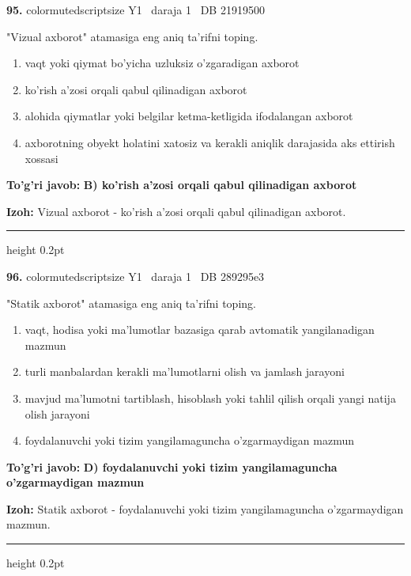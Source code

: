 \documentclass[10pt,a4paper,oneside]{article}
\begin{document}
\noindent\textbf{\color{ink}95.}  {color{muted}scriptsize Y1 \textbullet\ daraja 1 \textbullet\ DB 21919500}
\par
"Vizual axborot" atamasiga eng aniq ta'rifni toping.
\begin{enumerate}[label=\Alph*),leftmargin=9mm]
\item vaqt yoki qiymat bo'yicha uzluksiz o'zgaradigan axborot
\item ko'rish a'zosi orqali qabul qilinadigan axborot
\item alohida qiymatlar yoki belgilar ketma-ketligida ifodalangan axborot
\item axborotning obyekt holatini xatosiz va kerakli aniqlik darajasida aks ettirish xossasi
\end{enumerate}
\begin{tcolorbox}[enhanced,breakable,colback=teal!4,colframe=teal!50!black,boxrule=0.5pt,arc=1.1mm,left=3mm,right=3mm,top=1.7mm,bottom=1.7mm,before skip=2mm,after skip=2mm]
\textbf{\color{teal}To'g'ri javob:} \textbf{B) ko'rish a'zosi orqali qabul qilinadigan axborot}
\par\smallskip
\textbf{Izoh:} Vizual axborot - ko'rish a'zosi orqali qabul qilinadigan axborot.
\end{tcolorbox}
\vspace{2mm}\hrule height 0.2pt \vspace{3mm}

\noindent\textbf{\color{ink}96.}  {color{muted}scriptsize Y1 \textbullet\ daraja 1 \textbullet\ DB 289295e3}
\par
"Statik axborot" atamasiga eng aniq ta'rifni toping.
\begin{enumerate}[label=\Alph*),leftmargin=9mm]
\item vaqt, hodisa yoki ma'lumotlar bazasiga qarab avtomatik yangilanadigan mazmun
\item turli manbalardan kerakli ma'lumotlarni olish va jamlash jarayoni
\item mavjud ma'lumotni tartiblash, hisoblash yoki tahlil qilish orqali yangi natija olish jarayoni
\item foydalanuvchi yoki tizim yangilamaguncha o'zgarmaydigan mazmun
\end{enumerate}
\begin{tcolorbox}[enhanced,breakable,colback=teal!4,colframe=teal!50!black,boxrule=0.5pt,arc=1.1mm,left=3mm,right=3mm,top=1.7mm,bottom=1.7mm,before skip=2mm,after skip=2mm]
\textbf{\color{teal}To'g'ri javob:} \textbf{D) foydalanuvchi yoki tizim yangilamaguncha o'zgarmaydigan mazmun}
\par\smallskip
\textbf{Izoh:} Statik axborot - foydalanuvchi yoki tizim yangilamaguncha o'zgarmaydigan mazmun.
\end{tcolorbox}
\vspace{2mm}\hrule height 0.2pt \vspace{3mm}
\end{document}
